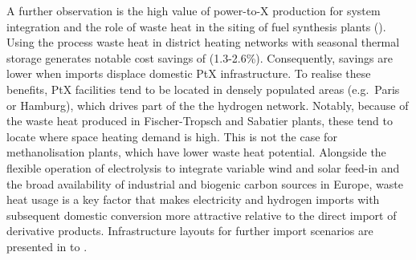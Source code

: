 
A further observation is the high value of power-to-X production for system
integration and the role of waste heat in the siting of fuel synthesis plants
(). Using the process waste heat in district heating
networks with seasonal thermal storage generates notable cost savings of
 (1.3-2.6\%). Consequently, savings are lower when imports
displace domestic PtX infrastructure. To realise these benefits, PtX facilities
tend to be located in densely populated areas (e.g.~Paris or Hamburg), which
drives part of the the hydrogen network. Notably, because of the waste heat
produced in Fischer-Tropsch and Sabatier plants, these tend to locate where
space heating demand is high. This is not the case for methanolisation plants,
which have lower waste heat potential. Alongside the flexible operation of
electrolysis to integrate variable wind and solar feed-in and the broad
availability of industrial and biogenic carbon sources in Europe, waste heat
usage is a key factor that makes electricity and hydrogen imports with
subsequent domestic conversion more attractive relative to the direct import of
derivative products. Infrastructure layouts for further import scenarios are
presented in  to .
